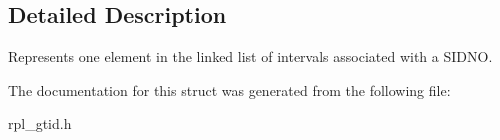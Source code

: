\subsection{Detailed Description}
Represents one element in the linked list of intervals associated with a S\+I\+D\+NO. 

The documentation for this struct was generated from the following file\+:\begin{DoxyCompactItemize}
\item 
rpl\+\_\+gtid.\+h\end{DoxyCompactItemize}

